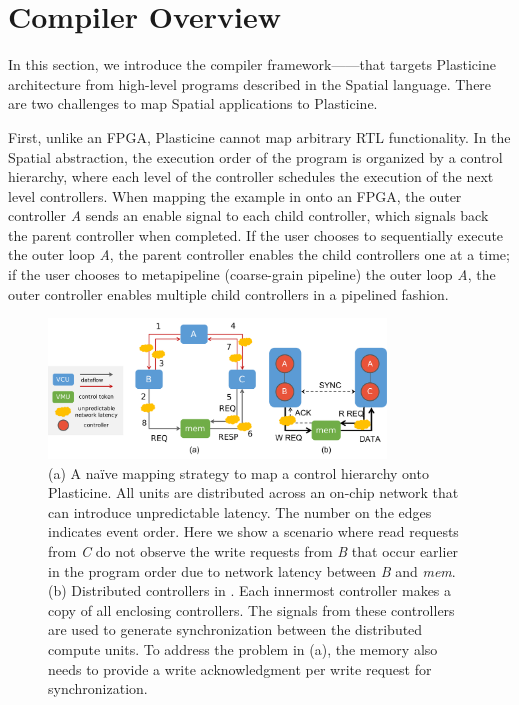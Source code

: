 \section{\name Compiler Overview} \label{sec:compileroverview}

In this section, we introduce the compiler framework---\name---that targets Plasticine
architecture from high-level programs described in the Spatial language. 
There are two challenges to map Spatial applications to Plasticine. 

First, unlike an FPGA, Plasticine cannot map arbitrary RTL functionality.
In the Spatial abstraction, the execution order of the program is organized by a control hierarchy, where
each level of the controller schedules the execution of the next level controllers.
When mapping the example in  onto an FPGA, the outer controller \emph{A}
sends an enable signal to each child controller, which signals back the parent controller when
completed. If the user chooses to sequentially execute the outer loop \emph{A}, the parent
controller enables the child controllers one at a time; if the user chooses to metapipeline
(coarse-grain pipeline) the outer loop \emph{A}, the outer controller enables multiple child controllers in a pipelined fashion.

\begin{figure}
\centering
  \centering
\includegraphics[width=0.8\textwidth]{figs/centralctrl.pdf}
  \caption[A na\"ive mapping strategy and distribute control flow in \name]{
  (a) A na\"ive mapping strategy to map a control hierarchy onto Plasticine.
  All units are distributed across an on-chip network that can introduce unpredictable latency.
  The number on the edges indicates event order.
  Here we show a scenario where read requests from \emph{C} do not observe the write requests from
  \emph{B} that occur earlier in the program order due to network latency between \emph{B} and
  \emph{mem}.
  (b) Distributed controllers in \name. Each innermost controller makes a copy of all enclosing
  controllers. The signals from these controllers are used to generate synchronization between the distributed compute units. To address the problem in (a), the memory also needs to provide a write acknowledgment per write request for synchronization.
}
\label{fig:centralctrl}
\end{figure}


